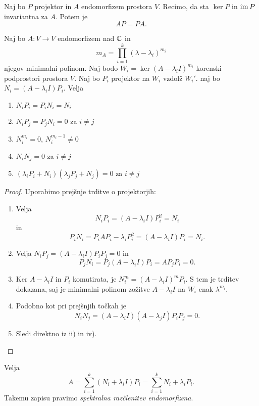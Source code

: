 \documentclass[12pt, a4paper]{article}
\begin{document}
\obvs

\begin{trditev}
Naj bo $P$ projektor in $A$ endomorfizem prostora $V$. Recimo, da sta $\ker P$ in $\operatorname{im} P$ invariantna za $A$. Potem je
\[
AP=PA.
\]
\end{trditev}

\obvs

\begin{trditev}
Naj bo $A\colon V\to V$ endomorfizem nad $\mathbb{C}$ in
\[
m_A=\prod_{i=1}^k(\lambda-\lambda_i)^{m_i}
\]
njegov minimalni polinom. Naj bodo $W_i=\ker(A-\lambda_iI)^{m_i}$ korenski podprostori prostora $V$. Naj bo $P_i$ projektor na $W_i$ vzdolž $W_i'$. naj bo $N_i=(A-\lambda_iI)P_i$. Velja

\begin{enumerate}[label=\roman*)]
\item $N_iP_i=P_iN_i=N_i$
\item $N_iP_j=P_jN_i=0$ za $i\ne j$
\item $N_i^{m_i}=0$, $N_i^{m_i-1}\ne 0$
\item $N_iN_j=0$ za $i\ne j$
\item $(\lambda_iP_i+N_i)(\lambda_jP_j+N_j)=0$ za $i\ne j$
\end{enumerate}
\end{trditev}

\begin{proof}
Uporabimo prejšnje trditve o projektorjih:

\begin{enumerate}[label=\roman*)]
\item Velja
\[
N_iP_i=(A-\lambda_iI)P_i^2=N_i
\]
in
\[
P_iN_i=P_iAP_i-\lambda_iP_i^2=(A-\lambda_iI)P_i=N_i.
\]
\item Velja $N_iP_j=(A-\lambda_iI)P_iP_j=0$ in
\[
P_jN_i=P_j(A-\lambda_iI)P_i=AP_jP_i=0.
\]
\item Ker $A-\lambda_iI$ in $P_i$ komutirata, je $N_i^{m}=(A-\lambda_iI)^{m}P_i$. S tem je trditev dokazana, saj je minimalni polinom zožitve $A-\lambda_iI$ na $W_i$ enak $\lambda^{m_i}$.
\item Podobno kot pri prejšnjih točkah je
\[
N_iN_j=(A-\lambda_iI)(A-\lambda_jI)P_iP_j=0.
\]
\item Sledi direktno iz ii) in iv).\qedhere
\end{enumerate}
\end{proof}

\begin{trditev}
Velja
\[
A=\sum_{i=1}^k (N_i+\lambda_iI)P_i=\sum_{i=1}^k N_i+\lambda_iP_i.
\]
Takemu zapisu pravimo \emph{spektralna razčlenitev endomorfizma}.
\end{trditev}
\end{document}
